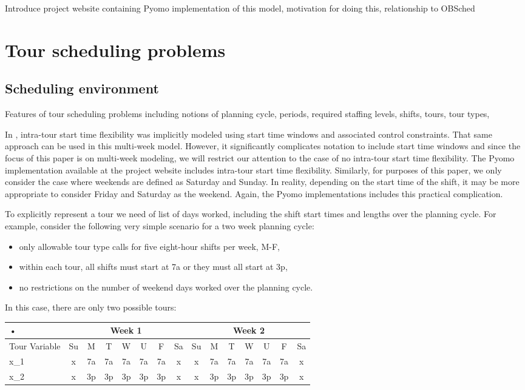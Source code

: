 \documentclass{article}
\begin{document}
Introduce project website containing Pyomo implementation of this model, motivation for doing this, relationship to OBSched

\section{Tour scheduling problems}

\subsection{Scheduling environment}
\label{sec-schedenv}

Features of tour scheduling problems including notions of planning cycle, periods, required staffing levels, shifts, tours, tour types, 

In \cite{isken:2004}, intra-tour start time flexibility was implicitly modeled using start time windows and associated control constraints. That same approach can be used in this multi-week model. However, it significantly complicates notation to include start time windows and since the focus of this paper is on multi-week modeling, we will restrict our attention to the case of no intra-tour start time flexibility. The Pyomo implementation available at the project website includes intra-tour start time flexibility.  Similarly, for purposes of this paper, we only consider the case where weekends are defined as Saturday and Sunday. In reality, depending on the start time of the shift, it may be more appropriate to consider Friday and Saturday as the weekend. Again, the Pyomo implementations includes this practical complication. 

To explicitly represent a tour we need of list of days worked, including the shift start times and lengths over the planning cycle. For example, consider the following very simple scenario for a two week planning cycle:

\begin{itemize}
\item only allowable tour type calls for five eight-hour shifts per week, M-F,
\item within each tour, all shifts must start at 7a or they must all start at 3p,
\item no restrictions on the number of weekend days worked over the planning cycle.
\end{itemize}

In this case, there are only two possible tours:

\begin{tabular}{|l|c|c|c|c|c|c|c|c|c|c|c|c|c|c|}
\hline 
• & \multicolumn{7}{c|}{Week 1} & \multicolumn{7}{c|}{Week 2} \\ 
\hline 
Tour Variable & Su & M & T & W & U & F & Sa & Su & M & T & W & U & F & Sa \\ 
\hline 
x_1 & x & 7a & 7a & 7a & 7a & 7a & x & x & 7a & 7a & 7a & 7a & 7a & x \\ 
\hline 
x_2 & x & 3p & 3p & 3p & 3p & 3p & x & x & 3p & 3p & 3p & 3p & 3p & x \\ 
\hline 
\end{tabular} 
\end{document}
